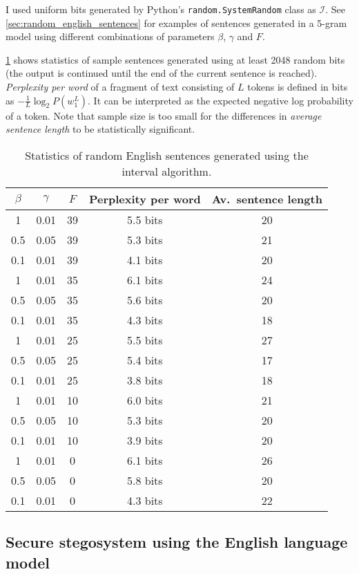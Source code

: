 \documentclass[draft]{IIBproject}
\makeatletter
\DeclareRobustCommand*{\AbbreviationWithDot}[1]{\@ifnextchar{.}{#1}{#1.\@\xspace}}
\DeclareRobustCommand*{\iid}{\AbbreviationWithDot{i.i.d}}
\makeatother
\begin{document}
I used \iid uniform bits generated by Python's \texttt{random.SystemRandom} class as $\mathcal I$. See \cref{sec:random_english_sentences} for examples of sentences generated in a 5-gram model using different combinations of parameters $\beta$, $\gamma$ and $F$.

\cref{tab:random_sentence_statistics} shows statistics of sample sentences generated using at least 2048 random bits (the output is continued until the end of the current sentence is reached). \emph{Perplexity per word} of a fragment of text consisting of $L$ tokens is defined in bits as $- \frac {1}{L} \log_2 P(w_1^L)$. It can be interpreted as the expected negative log probability of a token. Note that sample size is too small for the differences in \emph{average sentence length} to be statistically significant.

\begin{table}[h]
	\centering
	\begin{tabular}{ c | c | c || c | c}
	$\beta$ & $\gamma$ & $F$ & Perplexity per word & Av.\ sentence length \\
	\hline
	1 & 0.01 & 39 & 5.5 bits & 20 \\
	0.5 & 0.05 & 39 & 5.3 bits & 21 \\
	0.1 & 0.01 & 39 & 4.1 bits & 20 \\ \hline
	1 & 0.01 & 35 & 6.1 bits & 24 \\
	0.5 & 0.05 & 35 & 5.6 bits & 20 \\
	0.1 & 0.01 & 35 & 4.3 bits & 18 \\ \hline
	1 & 0.01 & 25 & 5.5 bits & 27 \\
	0.5 & 0.05 & 25 & 5.4 bits & 17 \\
	0.1 & 0.01 & 25 & 3.8 bits & 18 \\ \hline
	1 & 0.01 & 10 & 6.0 bits & 21 \\
	0.5 & 0.05 & 10 & 5.3 bits & 20 \\
	0.1 & 0.01 & 10 & 3.9 bits & 20 \\ \hline
	1 & 0.01 & 0 & 6.1 bits & 26 \\
	0.5 & 0.05 & 0 & 5.8 bits & 20 \\
	0.1 & 0.01 & 0 & 4.3 bits & 22
	\end{tabular}
	\caption{\label{tab:random_sentence_statistics}Statistics of random English sentences generated using the interval algorithm.}
\end{table}

\subsection{Secure stegosystem using the English language model}
\end{document}
